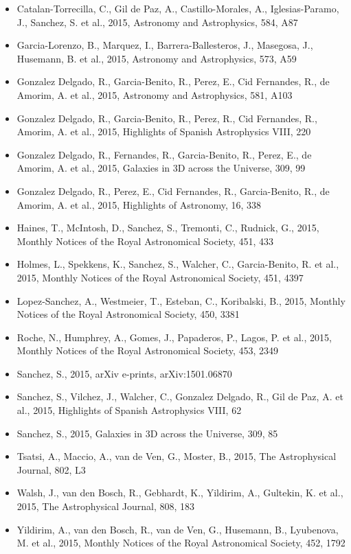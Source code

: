 \documentclass{letter}
\begin{document}
\begin{enumerate}
\begin{itemize}
\item Catalan-Torrecilla, C., Gil de Paz, A., Castillo-Morales, A., Iglesias-Paramo, J., Sanchez, S. et al., 2015, Astronomy and Astrophysics, 584, A87
\item Garcia-Lorenzo, B., Marquez, I., Barrera-Ballesteros, J., Masegosa, J., Husemann, B. et al., 2015, Astronomy and Astrophysics, 573, A59
\item Gonzalez Delgado, R., Garcia-Benito, R., Perez, E., Cid Fernandes, R., de Amorim, A. et al., 2015, Astronomy and Astrophysics, 581, A103
\item Gonzalez Delgado, R., Garcia-Benito, R., Perez, R., Cid Fernandes, R., Amorim, A. et al., 2015, Highlights of Spanish Astrophysics VIII, 220
\item Gonzalez Delgado, R., Fernandes, R., Garcia-Benito, R., Perez, E., de Amorim, A. et al., 2015, Galaxies in 3D across the Universe, 309, 99
\item Gonzalez Delgado, R., Perez, E., Cid Fernandes, R., Garcia-Benito, R., de Amorim, A. et al., 2015, Highlights of Astronomy, 16, 338
\item Haines, T., McIntosh, D., Sanchez, S., Tremonti, C., Rudnick, G., 2015, Monthly Notices of the Royal Astronomical Society, 451, 433
\item Holmes, L., Spekkens, K., Sanchez, S., Walcher, C., Garcia-Benito, R. et al., 2015, Monthly Notices of the Royal Astronomical Society, 451, 4397
\item Lopez-Sanchez, A., Westmeier, T., Esteban, C., Koribalski, B., 2015, Monthly Notices of the Royal Astronomical Society, 450, 3381
\item Roche, N., Humphrey, A., Gomes, J., Papaderos, P., Lagos, P. et al., 2015, Monthly Notices of the Royal Astronomical Society, 453, 2349
\item Sanchez, S., 2015, arXiv e-prints, arXiv:1501.06870
\item Sanchez, S., Vilchez, J., Walcher, C., Gonzalez Delgado, R., Gil de Paz, A. et al., 2015, Highlights of Spanish Astrophysics VIII, 62
\item Sanchez, S., 2015, Galaxies in 3D across the Universe, 309, 85
\item Tsatsi, A., Maccio, A., van de Ven, G., Moster, B., 2015, The Astrophysical Journal, 802, L3
\item Walsh, J., van den Bosch, R., Gebhardt, K., Yildirim, A., Gultekin, K. et al., 2015, The Astrophysical Journal, 808, 183
\item Yildirim, A., van den Bosch, R., van de Ven, G., Husemann, B., Lyubenova, M. et al., 2015, Monthly Notices of the Royal Astronomical Society, 452, 1792

\end{itemize}
\end{enumerate}
\end{document}
